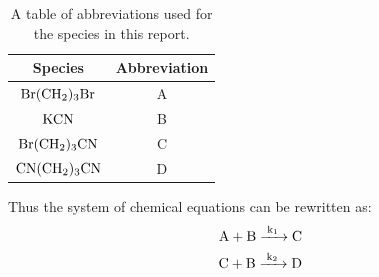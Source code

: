 \documentclass[twoside, 11pt]{article}
\begin{document}
\begin{table}[H]
\small
\centering
    \begin{tabular}{|c|c|}
    \hline
    Species & Abbreviation\\
    \hline
    $\ce{Br(CH2)3Br}$ & A \\
    $\ce{KCN}$        & B \\
    $\ce{Br(CH2)3CN}$ & C \\
    $\ce{CN(CH2)3CN}$ & D \\
    \hline
    \end{tabular}
    \caption{A table of abbreviations used for the species in this report.}
    \label{tab:abbvs}
\end{table}

Thus the system of chemical equations can be rewritten as:
\begin{align}
    \ce{A + B ->[k_1] C}\\
    \ce{C + B ->[k_2] D}
\end{align}
\end{document}
